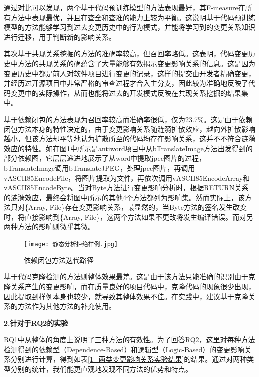 通过对比可以发现，两个基于代码预训练模型的方法表现最好，其F-measure在所有方法中表现最优，并且在查全和查准的能力上较为平衡。这说明基于代码预训练模型的方法能够学习到过去变更历史中的行为模式，并能将学习到的变更关系知识进行迁移，用于判断新的影响关系。

其次基于共现关系挖掘的方法的准确率较高，但召回率略低。这表明，代码变更历史中方法的共现关系的确蕴含了大量能够有效揭示变更影响关系的信息。这是因为变更历史中都是前人对软件项目进行变更的记录，这样的提交由开发者精确变更，并经历过开源项目中非常严格的审查过程才合入主分支，因此较为准确地反映了代码变更中的实际操作，从而也能将过去的开发模式反映在共现关系挖掘的结果集中。


基于依赖闭包的方法表现为召回率较高而准确率很低，仅为23.7\%。这是由于依赖闭包方法本身的特性决定的，由于变更影响关系随涟漪扩散效应，越向外扩散影响越小，但该方法却平等地认为扩散所至的代码均存在影响关系，这并不不符合涟漪效应的特性。如在图\ref{1_依赖闭包方法迭代路径}中所示是antiword项目中从bTranslateImage方法出发得到的部分依赖图，它层层递进地展示了从word中提取jpec图片的过程，bTranslateImage调用bTranslateJPEG，处理jpec图片，再调用vASCII85EncodeFile，将图片提取为文件，再依次调用vASCII85EncodeArray和vASCII85EncodeByte。当对Byte方法进行变更影响分析时，根据RETURN关系的涟漪效应，最终会将图中所示的其他4个方法都列为影响集。然而实际上，该方法只对\{Array, File\}存在变更影响关系，最显然的，当Byte方法的签名发生改变时，将直接影响到\{Array, File\}，这两个方法如果不更改将发生编译错误。而对另两种方法的影响则微乎其微。

\begin{figure}[htbp]
\centering
\texttt{[image: 静态分析拒绝样例.jpg]}
\caption{依赖闭包方法迭代路径}
\label{1_依赖闭包方法迭代路径}
\end{figure}


基于代码克隆检测的方法则整体效果最差。这是由于该方法只能准确的识别由于克隆关系产生的变更影响，而在质量良好的项目代码中，克隆代码的现象很少出现，因此提取到样例本身也较少，就导致其整体效果不佳。在实践中，建议基于克隆关系的方法作为其他方法的补充使用。

\textbf{2.针对于RQ2的实验}

RQ1中从整体的角度上说明了三种方法的有效性。为了回答RQ2，这里对每种方法检测得到的依赖型（Dependence-Based）和逻辑型（Logic-Based）的变更影响关系分别进行计算，得到如表\ref{1_两类变更影响关系实验结果}的结果。通过对两种类型分别的统计，我们能更直观地发现不同方法的优势和特点。



